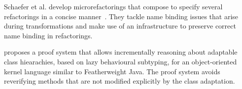 Schaefer et al. develop microrefactorings that compose to specify several refactorings in a concise manner~\cite{Schafer-OOPSLA-2010}.
They tackle name binding issues that arise during transformations and make use of an infrastructure to preserve correct name binding in refactorings.



\cite{dovland:adaptableclass2015} proposes a proof system that allows
incrementally reasoning about adaptable class hiearachies, based on
lazy behavioural subtyping, for 
an object-oriented kernel language similar to Featherweight Java.  The
proof system avoids reverifying methods that are not modified
explicitly by the class adaptation.



